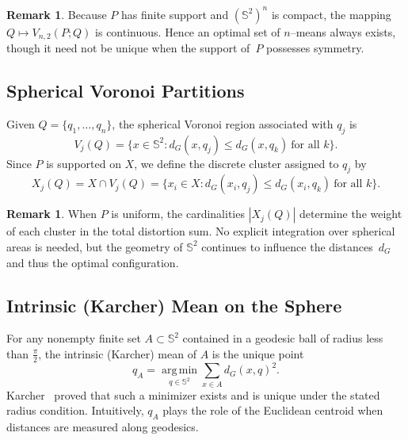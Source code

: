 \documentclass[12pt, reqno]{amsart}
\theoremstyle{plain}
\theoremstyle{definition}
\newtheorem{remark}[subsection]{Remark}
\newcommand{\D}[1]{\mathbb{#1}}%
\begin{document}
\begin{remark}
Because $P$ has finite support and $(\mathbb S^{2})^{n}$ is compact,
the mapping $  Q\mapsto V_{n,2}(P;   Q)$ is continuous.
Hence an optimal set of $n$--means always exists, though it need not be unique when
the support of~$P$ possesses symmetry.
\end{remark}

\subsection{Spherical Voronoi Partitions}

Given $ {Q} = \{ {q}_1,\ldots, {q}_n\}$, the spherical Voronoi region associated with $ {q}_j$ is
\begin{equation}
V_j( {Q}) = \{ {x} \in \D S^2 : d_G( {x}, {q}_j) \le d_G( {x}, {q}_k) \ \text{for all } k\}.
\end{equation}
Since $P$ is supported on $ {X}$, we define the discrete cluster assigned to $ {q}_j$ by
\begin{equation}
 {X}_j( {Q}) =  {X} \cap V_j( {Q})
= \{ {x}_i \in  {X} : d_G( {x}_i, {q}_j) \le d_G( {x}_i, {q}_k) \ \text{for all } k\}.
\end{equation}


\begin{remark}
When $P$ is uniform, the cardinalities $|  X_{j}(Q)|$ determine the weight of each
cluster in the total distortion sum.
No explicit integration over spherical areas is needed, but the geometry of
$\mathbb S^{2}$ continues to influence the distances~$d_{G}$ and thus the
optimal configuration.
\end{remark}
\subsection{Intrinsic (Karcher) Mean on the Sphere}

For any nonempty finite set $A \subset \D S^2$ contained in a geodesic ball of radius less than $\frac{\pi}{2}$, the intrinsic (Karcher) mean of $A$ is the unique point
\begin{equation}
 {q}_A = \operatorname*{arg\,min}_{ {q} \in \D S^2} \sum_{ {x} \in A} d_G( {x}, {q})^2.
\end{equation}
Karcher~\cite{Karcher1977} proved that such a minimizer exists and is unique
under the stated radius condition.
Intuitively, $ {q}_A$ plays the role of the Euclidean centroid when distances
are measured along geodesics.
\end{document}
